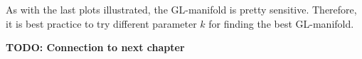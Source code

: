 \begin{tcolorbox}[colback=red!5!white,colframe=red!75!black]
    As with the last plots illustrated, the GL-manifold is pretty sensitive.
    Therefore, it is best practice to try different parameter $k$ for finding the best 
    GL-manifold.
\end{tcolorbox}



\textbf{TODO: Connection to next chapter}